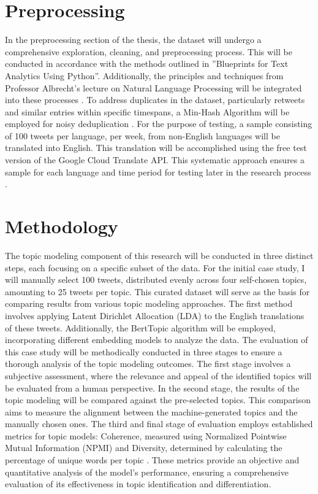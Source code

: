 \documentclass[
    11pt,
    a4paper,
    egregdoesnotlikesansseriftitles,
    toc=chapterentrywithdots,
    oneside,openright,
    titlepage,
    parskip=half,
    headings=normal,  %
    listof=totoc,
    bibliography=totoc,
    index=totoc,
    captions=tableheading,  %
    chapterprefix,
    listof=flat,
    final
]{scrbook}
\begin{document}
{\let\clearpage\relax \chapter{Preprocessing}}
In the preprocessing section of the thesis, the dataset will undergo a comprehensive exploration, cleaning, and preprocessing process. This will be conducted in accordance with the methods outlined in ''Blueprints for Text Analytics Using Python''. Additionally, the principles and techniques from Professor Albrecht's lecture on Natural Language Processing will be integrated into these processes \cite{Albrecht}.
To address duplicates in the dataset, particularly retweets and similar entries within specific timespans, a Min-Hash Algorithm will be employed for noisy deduplication \cite{Dedupl}.
For the purpose of testing, a sample consisting of 100 tweets per language, per week, from non-English languages will be translated into English. This translation will be accomplished using the free test version of the Google Cloud Translate API. This systematic approach ensures a sample for each language and time period for testing later in the research process \cite{GoogleTranslateApi}.

{\let\clearpage\relax \chapter{Methodology}}

The topic modeling component of this research will be conducted in three distinct steps, each focusing on a specific subset of the data. For the initial case study, I will manually select 100 tweets, distributed evenly across four self-chosen topics, amounting to 25 tweets per topic. This curated dataset will serve as the basis for comparing results from various topic modeling approaches. The first method involves applying Latent Dirichlet Allocation (LDA) \cite{LDA} to the English translations of these tweets. Additionally, the BertTopic \cite{BERTopic} algorithm will be employed, incorporating different embedding models to analyze the data.
The evaluation of this case study will be methodically conducted in three stages to ensure a thorough analysis of the topic modeling outcomes. The first stage involves a subjective assessment, where the relevance and appeal of the identified topics will be evaluated from a human perspective. In the second stage, the results of the topic modeling will be compared against the pre-selected topics. This comparison aims to measure the alignment between the machine-generated topics and the manually chosen ones. The third and final stage of evaluation employs established metrics for topic models: Coherence, measured using Normalized Pointwise Mutual Information (NPMI)\cite{npmi} and Diversity, determined by calculating the percentage of unique words per topic \cite{diversity}. These metrics provide an objective and quantitative analysis of the model's performance, ensuring a comprehensive evaluation of its effectiveness in topic identification and differentiation.
\end{document}
